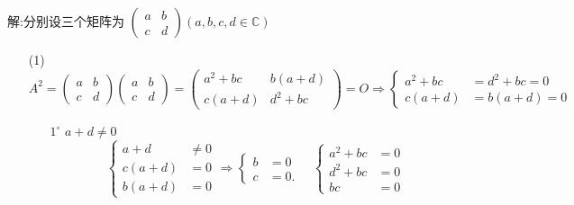 \documentclass{article}
\begin{document}
\begin{enumerate}
        解:分别设三个矩阵为
        $\begin{pmatrix}
            a& b\\
            c& d
        \end{pmatrix}(a,b,c,d\in \mathbb{C})$
        \begin{enumerate}
            \item [(1)]
            \[
                A^2=
                \begin{pmatrix}
                    a& b\\
                    c& d
                \end{pmatrix}
                \begin{pmatrix}
                    a& b\\
                    c& d
                \end{pmatrix}
                =
                \begin{pmatrix}
                    a^2+bc& b(a+d)\\
                    c(a+d)& d^2+bc
                \end{pmatrix}
                =O
                \Rightarrow
                \begin{cases}
                    a^2+bc&=d^2+bc=0\\
                    c(a+d)&=b(a+d)=0
                \end{cases}
            \]
            \begin{enumerate}
                \item [$1^\circ$]$a+d\neq 0$
                \[
                    \begin{cases}
                        a+d&\neq 0\\
                        c(a+d)&= 0\\
                        b(a+d)&= 0
                    \end{cases}
                    \Rightarrow
                    \begin{cases}
                        b&=0\\
                        c&=0.
                    \end{cases}
                    \quad
                    \begin{cases}
                        a^2+bc&=0\\
                        d^2+bc&=0\\
                        bc&=0
                    \end{cases}
\]
\end{enumerate}
\end{enumerate}
\end{enumerate}
\end{document}
